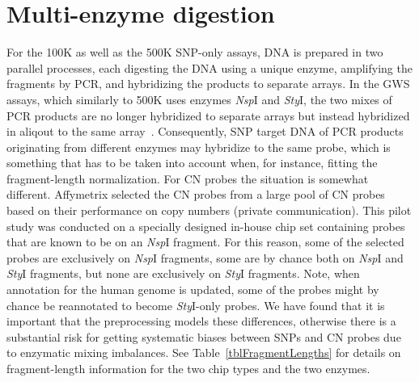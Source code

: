 \documentclass[10pt,a4paper]{article}
\newcommand{\GWSSix}{GWS6\xspace}
\newcommand{\NspI}{\emph{Nsp}I\xspace}
\newcommand{\StyI}{\emph{Sty}I\xspace}
\begin{document}
\clearpage
\section{Multi-enzyme digestion}
\label{secMultiEnzymeDigestion}
For the 100K as well as the 500K SNP-only assays, DNA is prepared in two parallel processes, each digesting the DNA using a unique enzyme, amplifying the fragments by PCR, and hybridizing the products to separate arrays.  In the GWS assays, which similarly to 500K uses enzymes \NspI and \StyI, the two mixes of PCR products are no longer hybridized to separate arrays but instead hybridized in aliqout to the same array~\citep{Affymetrix_2007f,Affymetrix_2007g}.
Consequently, SNP target DNA of PCR products originating from different enzymes may hybridize to the same probe, which is something that has to be taken into account when, for instance, fitting the fragment-length normalization.
For CN probes the situation is somewhat different.  Affymetrix selected the CN probes from a large pool of CN probes based on their performance on copy numbers (private communication).  This pilot study was conducted on a specially designed in-house chip set containing probes that are known to be on an \NspI fragment.  For this reason, some of the selected probes are exclusively on \NspI fragments, some are by chance both on \NspI and \StyI fragments, but none are exclusively on \StyI fragments.  Note, when annotation for the human genome is updated, some of the probes might by chance be reannotated to become \StyI-only probes.
We have found that it is important that the preprocessing models these differences, otherwise there is a substantial risk for getting systematic biases between SNPs and CN probes due to enzymatic mixing imbalances.
See Table~\ref{tblFragmentLengths} for details on fragment-length information for the two chip types and the two enzymes.

\end{document}
